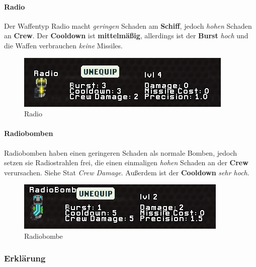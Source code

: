 \documentclass[fontsize=12pt,paper=a4,twoside]{scrartcl}
\begin{document}
\paragraph{Radio}

Der Waffentyp Radio macht \textit{geringen} Schaden am \textbf{Schiff}, jedoch \textit{hohen} Schaden an \textbf{Crew}. Der \textbf{Cooldown} ist \textbf{mittelmäßig}, allerdings ist der \textbf{Burst} \textit{hoch} und die Waffen verbrauchen \textit{keine} Missiles. 

\begin{figure}[H]
\centering
\includegraphics[width=1\linewidth]{DasSpiel/Kampf/waffen/radio.png}
\caption{Radio}
\end{figure}

\paragraph{Radiobomben}

Radiobomben haben einen geringeren Schaden als normale Bomben, jedoch setzen sie Radiostrahlen frei, die einen einmaligen \textit{hohen} Schaden an der \textbf{Crew} verursachen. Siehe Stat \textit{Crew Damage}. Außerdem ist der \textbf{Cooldown} \textit{sehr hoch}. 

\begin{figure}[H]
\centering
\includegraphics[width=1\linewidth]{DasSpiel/Kampf/waffen/radiobo.png}
\caption{Radiobombe}
\end{figure}

\subsubsection{Erklärung}
\label{sec:Erklärung}
\end{document}
